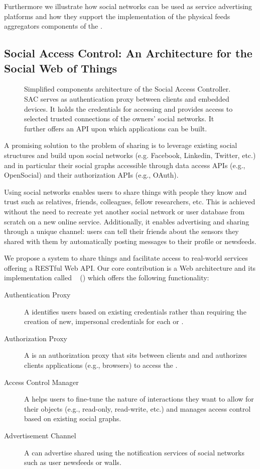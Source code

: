 Furthermore we illustrate how social networks can be used as service advertising platforms and how they support the implementation of the physical feeds aggregators components of the \WoTA{}.

\subsection{Social Access Control: An Architecture for the Social Web of Things}\label{SAC}
\begin{figure}
\caption{Simplified components architecture of the Social Access Controller. SAC serves as authentication proxy between clients and embedded devices. It holds the credentials for accessing \sts{} and provides access to selected trusted connections of the owners' social networks. It further offers an API upon which applications can be built.}
\label{fig:componentArchitecture}
\end{figure}
A promising solution to the problem of sharing \sts{} is to leverage existing social structures and build upon social networks (e.g. Facebook, Linkedin, Twitter, etc.) and in particular their social graphs accessible through data access APIs (e.g., OpenSocial) and their authorization APIs (e.g., OAuth). 

Using social networks enables users to share things with people they know and trust such as relatives, friends, colleagues, fellow researchers, etc. This is achieved without the need to recreate yet another social network or user database from scratch on a new online service. Additionally, it enables advertising and sharing through a unique channel: users can tell their friends about the sensors they shared with them by automatically posting messages to their profile or newsfeeds. 

We propose a system to share things and facilitate access to real-world services offering a RESTful Web API.
Our core contribution is a Web architecture and its implementation called \sacLong{}~\cite{Guinard2010-sharing,MathiasFischer2009} (\sac{}) which offers the following functionality:

\begin{description}
 \item[Authentication Proxy] A \sac{} identifies users based on existing credentials rather than requiring the creation of new, impersonal credentials for each \st{} or \sg{}.
 \item[Authorization Proxy] A \sac{} is an authorization proxy that sits between clients and \sts{} and authorizes clients applications (e.g., browsers) to access the \sts{}.
 \item[Access Control Manager] A \sac{} helps users to fine-tune the nature of interactions they want to allow for their objects (e.g., read-only, read-write, etc.) and manages access control based on existing social graphs.
 \item[Advertisement Channel] A \sac{} can advertise shared \sts{} using the notification services of social networks such as user newsfeeds or walls.
\end{description}

